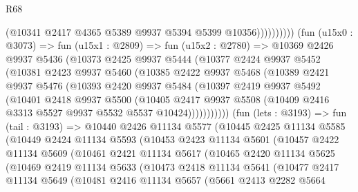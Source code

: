 \begin{lexlean}{R68}
\begin{coremodule}
                          (@10341 @2417 @4365 @5389 @9937 @5394 @5399 @10356))))))))))
        (fun (u15x0 : @3073) =>
        fun (u15x1 : @2809) =>
        fun (u15x2 : @2780) =>
        @10369
          @2426
          @9937
          @5436
          (@10373
            @2425
            @9937
            @5444
            (@10377
              @2424
              @9937
              @5452
              (@10381
                @2423
                @9937
                @5460
                (@10385
                  @2422
                  @9937
                  @5468
                  (@10389
                    @2421
                    @9937
                    @5476
                    (@10393
                      @2420
                      @9937
                      @5484
                      (@10397
                        @2419
                        @9937
                        @5492
                        (@10401
                          @2418
                          @9937
                          @5500
                          (@10405
                            @2417
                            @9937
                            @5508
                            (@10409 @2416 @3313 @5527 @9937 @5532 @5537 @10424)))))))))))
        (fun (lets : @3193) =>
        fun (tail : @3193) =>
        @10440
          @2426
          @11134
          @5577
          (@10445
            @2425
            @11134
            @5585
            (@10449
              @2424
              @11134
              @5593
              (@10453
                @2423
                @11134
                @5601
                (@10457
                  @2422
                  @11134
                  @5609
                  (@10461
                    @2421
                    @11134
                    @5617
                    (@10465
                      @2420
                      @11134
                      @5625
                      (@10469
                        @2419
                        @11134
                        @5633
                        (@10473
                          @2418
                          @11134
                          @5641
                          (@10477
                            @2417
                            @11134
                            @5649
                            (@10481
                              @2416
                              @11134
                              @5657
                              (@5661
                                @2413
                                @2282
                                @5664

\end{coremodule}
\end{lexlean}
